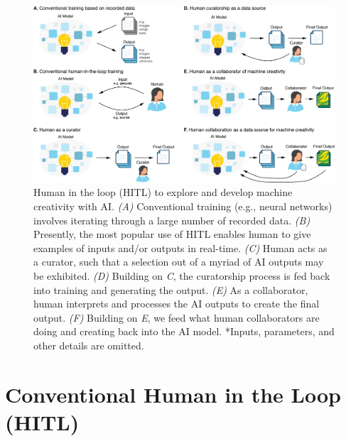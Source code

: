 \documentclass[letterpaper]{article} %
\begin{document}
\begin{figure}[tbh!]
\begin{center}
\includegraphics[width=1\textwidth]{hitl_creativity2.png}
\end{center}
\caption{Human in the loop (HITL) to explore and develop machine creativity with AI. \emph{(A)} Conventional training (e.g., neural networks) involves iterating through a large number of recorded data. \emph{(B)} Presently, the most popular use of HITL enables human to give examples of inputs and/or outputs in real-time. \emph{(C)} Human acts as a curator, such that a selection out of a myriad of AI outputs may be exhibited. \emph{(D)} Building on \emph{C}, the curatorship process is fed back into training and generating the output. \emph{(E)} As a collaborator, human interprets and processes the AI outputs to create the final output. \emph{(F)} Building on \emph{E}, we feed what human collaborators are doing and creating back into the AI model. *Inputs, parameters, and other details are omitted.}
\label{hitl}
\end{figure}

\section{Conventional Human in the Loop (HITL)}
\end{document}
